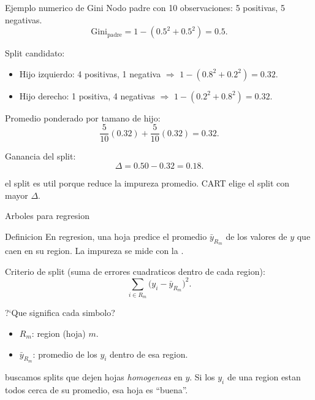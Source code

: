 \begin{frame}{Ejemplo numerico de Gini}
Nodo padre con 10 observaciones: 5 positivas, 5 negativas.
\[
\mathrm{Gini}_{\text{padre}} = 1 - (0.5^2 + 0.5^2) = 0.5.
\]

\vspace{0.2em}
Split candidato:
\begin{itemize}\small
  \item Hijo izquierdo: 4 positivas, 1 negativa $\Rightarrow$ $1-(0.8^2+0.2^2) = 0.32$.
  \item Hijo derecho: 1 positiva, 4 negativas $\Rightarrow$ $1-(0.2^2+0.8^2) = 0.32$.
\end{itemize}

\vspace{0.2em}
Promedio ponderado por tamano de hijo:
\[
\frac{5}{10}(0.32) + \frac{5}{10}(0.32) = 0.32.
\]

\vspace{0.2em}
Ganancia del split:
\[
\Delta = 0.50 - 0.32 = 0.18.
\]

\vspace{0.2em}
 el split es util porque reduce la impureza promedio. CART elige el split con mayor $\Delta$.
\end{frame}

\begin{frame}{Arboles para regresion}
\begin{block}{Definicion}
\small
En regresion, una hoja predice el promedio $\bar y_{R_m}$ de los valores de $y$ que caen en su region. La impureza se mide con la .
\end{block}

\vspace{0.3em}
Criterio de split (suma de errores cuadraticos dentro de cada region):
\[
\sum_{i \in R_m} \big(y_i - \bar y_{R_m}\big)^2.
\]

\vspace{0.2em}
?`Que significa cada simbolo?
\begin{itemize}\small
  \item $R_m$: region (hoja) $m$.
  \item $\bar y_{R_m}$: promedio de los $y_i$ dentro de esa region.
\end{itemize}

\vspace{0.2em}
 buscamos splits que dejen hojas \emph{homogeneas} en $y$. Si los $y_i$ de una region estan todos cerca de su promedio, esa hoja es ``buena''.
\end{frame}


